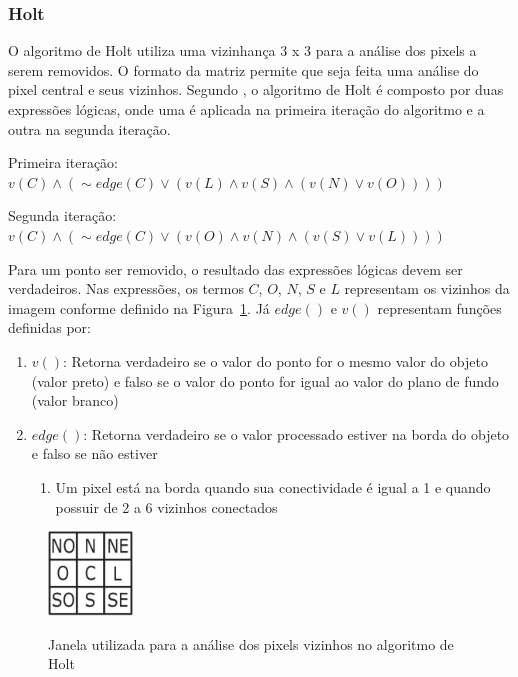 \documentclass[12pt,oneside,a4paper,english,french,spanish,brazil,]{abntex2}
\begin{document}
\subsubsection{Holt}

O algoritmo de Holt \cite{holt:1987} utiliza uma vizinhança 3 x 3 para a análise dos pixels a serem removidos. O formato da matriz permite que seja feita uma análise do pixel central e seus vizinhos. Segundo \citet{guilherme:2007}, o algoritmo de Holt é composto por duas expressões lógicas, onde uma é aplicada na primeira iteração do algoritmo e a outra na segunda iteração.


Primeira iteração: 
\(v(C) \wedge (\sim edge(C) \vee (v(L) \wedge v(S) \wedge (v(N) \vee v(O))))\)

Segunda iteração:
\(v(C) \wedge (\sim edge(C) \vee (v(O) \wedge v(N) \wedge (v(S) \vee v(L))))\)

Para um ponto ser removido, o resultado das expressões lógicas devem ser verdadeiros. Nas expressões, os termos \(C\), \(O\), \(N\), \(S\) e \(L\) representam os vizinhos da imagem conforme definido na Figura~\ref{fig:PDI_Holt_1}. Já \(edge()\) e \(v()\) representam funções definidas por:
\begin{enumerate}
\item \(v()\): Retorna verdadeiro se o valor do ponto for o mesmo valor do objeto (valor preto) e falso se o valor do ponto for igual ao valor do plano de fundo (valor branco)
\item \(edge()\): Retorna verdadeiro se o valor processado estiver na borda do objeto e falso se não estiver
\begin{enumerate}[label*=\roman*.]
    \item Um pixel está na borda quando sua conectividade é igual a 1 e quando possuir de 2 a 6 vizinhos conectados
  \end{enumerate}
\end{enumerate}

\begin{figure}[ht]
\centering
\caption{Janela utilizada para a análise dos pixels vizinhos no algoritmo de Holt}
\includegraphics[width=0.2\textwidth]{imagens/PDI_Holt_1.PNG}
\label{fig:PDI_Holt_1}
\end{figure}
\end{document}
